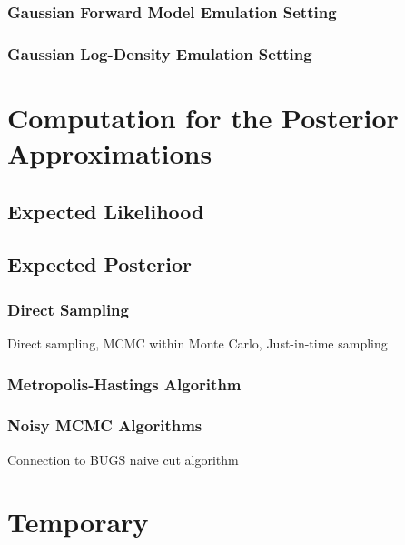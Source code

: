 \documentclass[12pt]{article}
\begin{document}
\subsubsection{Gaussian Forward Model Emulation Setting} \label{sec:fwd-Gaussian}
\subsubsection{Gaussian Log-Density Emulation Setting} \label{sec:ldens-Gaussian}


\section{Computation for the Posterior Approximations} \label{sec:computation}
\subsection{Expected Likelihood}
\subsection{Expected Posterior}
\subsubsection{Direct Sampling}
Direct sampling, MCMC within Monte Carlo, Just-in-time sampling
\subsubsection{Metropolis-Hastings Algorithm}
\subsubsection{Noisy MCMC Algorithms}
Connection to BUGS naive cut algorithm



\section{Temporary}
\end{document}
